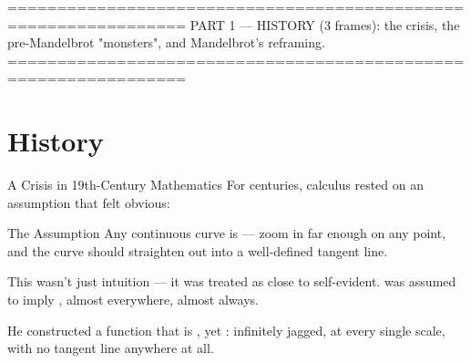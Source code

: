 



\begin{frame}
  \titlepage
\end{frame}

================================================================
PART 1 — HISTORY (3 frames): the crisis, the pre-Mandelbrot
"monsters", and Mandelbrot's reframing.
================================================================
\section{History}

\begin{frame}{A Crisis in 19th-Century Mathematics}
  \small
  For centuries, calculus rested on an assumption that felt obvious:

  \begin{conceptbox}{The Assumption}
    Any continuous curve is  —
    zoom in far enough on any point, and the curve should straighten
    out into a well-defined tangent line.
  \end{conceptbox}

  \pause
  \vspace{0.3cm}
  This wasn't just intuition — it was treated as close to self-evident.
   was assumed to imply ,
  almost everywhere, almost always.

  \pause
  \vspace{0.3cm}
  \begin{center}
  \end{center}

  \pause
  \vspace{0.2cm}
  He constructed a function that is ,
  yet : infinitely jagged, at every
  single scale, with no tangent line anywhere at all.
\end{frame}

